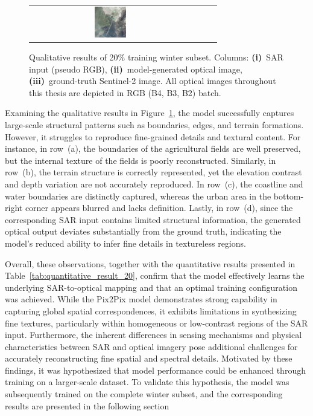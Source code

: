 \begin{figure}[!htbp]
\begin{tabular}{c *{3}{c}}
        \includegraphics[width=0.2\textwidth, height=0.2\textheight, keepaspectratio]{img/qualitative-20/sample_7/gt.png} \\
    \end{tabular}

    \caption[Qualitative results of 20\% training winter subset]{%
    Qualitative results of 20\% training winter subset.
    Columns: 
    \textbf{(i)}~SAR input (pseudo RGB), 
    \textbf{(ii)}~model-generated optical image, 
    \textbf{(iii)}~ground-truth Sentinel-2 image. All optical images throughout this thesis are depicted in RGB (B4, B3, B2) batch.}
    \label{fig:qualitative_results_20}
\end{figure}

Examining the qualitative results in Figure~\ref{fig:qualitative_results_20}, the model successfully captures large-scale structural patterns such as boundaries, edges, and terrain formations. However, it struggles to reproduce fine-grained details and textural content. For instance, in row~(a), the boundaries of the agricultural fields are well preserved, but the internal texture of the fields is poorly reconstructed. Similarly, in row~(b), the terrain structure is correctly represented, yet the elevation contrast and depth variation are not accurately reproduced. In row~(c), the coastline and water boundaries are distinctly captured, whereas the urban area in the bottom-right corner appears blurred and lacks definition. Lastly, in row~(d), since the corresponding SAR input contains limited structural information, the generated optical output deviates substantially from the ground truth, indicating the model’s reduced ability to infer fine details in textureless regions.


Overall, these observations, together with the quantitative results presented in Table~\ref{tab:quantitative_result_20}, confirm that the model effectively learns the underlying SAR-to-optical mapping and that an optimal training configuration was achieved. While the Pix2Pix model demonstrates strong capability in capturing global spatial correspondences, it exhibits limitations in synthesizing fine textures, particularly within homogeneous or low-contrast regions of the SAR input. Furthermore, the inherent differences in sensing mechanisms and physical characteristics between SAR and optical imagery pose additional challenges for accurately reconstructing fine spatial and spectral details. Motivated by these findings, it was hypothesized that model performance could be enhanced through training on a larger-scale dataset. To validate this hypothesis, the model was subsequently trained on the complete winter subset, and the corresponding results are presented in the following section

